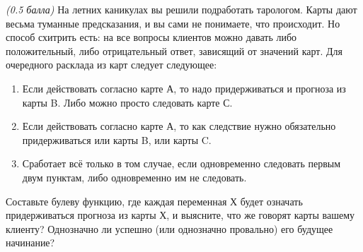 \question
\textit{(0.5 балла)} На летних каникулах вы решили подработать тарологом. Карты дают весьма туманные предсказания, и вы сами не понимаете, что происходит. Но способ схитрить есть: на все вопросы клиентов можно давать либо положительный, либо отрицательный ответ, зависящий от значений карт. Для очередного расклада из карт следует следующее:

\begin{enumerate}
\item Если действовать согласно карте А, то надо придерживаться и прогноза из карты B. Либо можно просто следовать карте С.
\item Если действовать согласно карте А, то как следствие нужно обязательно придерживаться или карты B, или карты C.
\item Сработает всё только в том случае, если одновременно следовать первым двум пунктам, либо одновременно им не следовать.
\end{enumerate}

Составьте булеву функцию, где каждая переменная Х будет означать \flqq придерживаться прогноза из карты Х\frqq, и выясните, что же говорят карты вашему клиенту? Однозначно ли успешно (или однозначно провально) его будущее начинание?